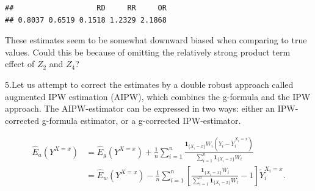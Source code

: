 \documentclass[
]{book}
\newenvironment{Shaded}{\begin{snugshade}}{\end{snugshade}}
\newcommand{\DecValTok}[1]{\textcolor[rgb]{0.00,0.00,0.81}{#1}}
\newcommand{\DocumentationTok}[1]{\textcolor[rgb]{0.56,0.35,0.01}{\textbf{\textit{#1}}}}
\newcommand{\FunctionTok}[1]{\textcolor[rgb]{0.13,0.29,0.53}{\textbf{#1}}}
\newcommand{\NormalTok}[1]{#1}
\newcommand{\OtherTok}[1]{\textcolor[rgb]{0.56,0.35,0.01}{#1}}
\newcommand{\SpecialCharTok}[1]{\textcolor[rgb]{0.81,0.36,0.00}{\textbf{#1}}}
\begin{document}
\begin{verbatim}
##                   RD     RR     OR 
## 0.8037 0.6519 0.1518 1.2329 2.1868
\end{verbatim}

These estimates seem to be somewhat downward biased when comparing
to true values. Could this be because of omitting the
relatively strong product term effect of \(Z_2\) and \(Z_4\)?

5.Let us attempt to correct the estimates by a double robust
approach called augmented IPW estimation (AIPW),
which combines the g-formula and the IPW approach. The AIPW-estimator
can be expressed in two ways:
either an IPW-corrected g-formula estimator, or
a g-corrected IPW-estimator.

\[
\begin{aligned}
 \widehat{E}_a(Y^{X=x}) & = \widehat{E}_g(Y^{X=x}) +
   \frac{1}{n} \sum_{i=1}^n \frac{ {\mathbf 1}_{\{X_i=x\}} W_i ( Y_i - \widetilde{Y}_i^{X_i=x} ) }
   {\sum_{i=1}^n {\mathbf 1}_{\{X_i=x\}} W_i} \\
       & =   \widehat{E}_w(Y^{X=x}) -
    \frac{1}{n} \sum_{i=1}^n \left[ \frac{ {\mathbf 1}_{\{X_i=x\}} W_i }
            {\sum_{i=1}^n {\mathbf 1}_{\{X_i=x\}} W_i } - 1 \right] \widetilde{Y}_i^{X_i=x}.
\end{aligned}
\]

\begin{Shaded}
\end{Shaded}
\end{document}
